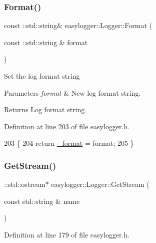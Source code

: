 \subsubsection{\texorpdfstring{Format()}{Format()}\hspace{0.1cm}{\footnotesize\ttfamily [2/2]}}
{\footnotesize\ttfamily const \+::std\+::string\& easylogger\+::\+Logger\+::\+Format (\begin{DoxyParamCaption}\item[{const \+::std\+::string \&}]{format }\end{DoxyParamCaption})\hspace{0.3cm}{\ttfamily [inline]}}

Set the log format string


\begin{DoxyParams}{Parameters}
{\em format} & New log format string. \\
\hline
\end{DoxyParams}
\begin{DoxyReturn}{Returns}
Log format string. 
\end{DoxyReturn}


Definition at line 203 of file easylogger.\+h.


\begin{DoxyCode}
203                                                          \{
204             \textcolor{keywordflow}{return} \mbox{\hyperlink{classeasylogger_1_1_logger_ab45891277952285a459ec39a03a91226}{\_format}} = format;
205         \}
\end{DoxyCode}
\mbox{\label{classeasylogger_1_1_logger_ac4a1ce9232d6c0c7ec7668957d4a35ba}} 
\subsubsection{\texorpdfstring{Get\+Stream()}{GetStream()}}
{\footnotesize\ttfamily \+::std\+::ostream$\ast$ easylogger\+::\+Logger\+::\+Get\+Stream (\begin{DoxyParamCaption}\item[{const std\+::string \&}]{name }\end{DoxyParamCaption})\hspace{0.3cm}{\ttfamily [inline]}}



Definition at line 179 of file easylogger.\+h.



